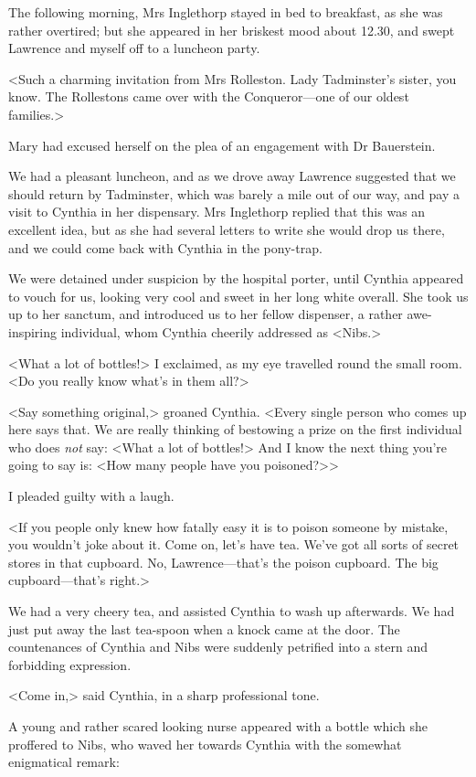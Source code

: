  The following morning, Mrs Inglethorp stayed in bed to breakfast, as she was rather overtired; but she appeared in her briskest mood about 12.30, and swept Lawrence and myself off to a luncheon party. 

 <Such a charming invitation from Mrs Rolleston. Lady Tadminster's sister, you know. The Rollestons came over with the Conqueror—one of our oldest families.> 

 Mary had excused herself on the plea of an engagement with Dr Bauerstein. 

 We had a pleasant luncheon, and as we drove away Lawrence suggested that we should return by Tadminster, which was barely a mile out of our way, and pay a visit to Cynthia in her dispensary. Mrs Inglethorp replied that this was an excellent idea, but as she had several letters to write she would drop us there, and we could come back with Cynthia in the pony-trap. 

 We were detained under suspicion by the hospital porter, until Cynthia appeared to vouch for us, looking very cool and sweet in her long white overall. She took us up to her sanctum, and introduced us to her fellow dispenser, a rather awe-inspiring individual, whom Cynthia cheerily addressed as <Nibs.> 

 <What a lot of bottles!> I exclaimed, as my eye travelled round the small room. <Do you really know what's in them all?> 

 <Say something original,> groaned Cynthia. <Every single person who comes up here says that. We are really thinking of bestowing a prize on the first individual who does \emph{not} say: <What a lot of bottles!> And I know the next thing you're going to say is: <How many people have you poisoned?>> 

 I pleaded guilty with a laugh. 

 <If you people only knew how fatally easy it is to poison someone by mistake, you wouldn't joke about it. Come on, let's have tea. We've got all sorts of secret stores in that cupboard. No, Lawrence—that's the poison cupboard. The big cupboard—that's right.> 

 We had a very cheery tea, and assisted Cynthia to wash up afterwards. We had just put away the last tea-spoon when a knock came at the door. The countenances of Cynthia and Nibs were suddenly petrified into a stern and forbidding expression. 

 <Come in,> said Cynthia, in a sharp professional tone. 

 A young and rather scared looking nurse appeared with a bottle which she proffered to Nibs, who waved her towards Cynthia with the somewhat enigmatical remark: 

